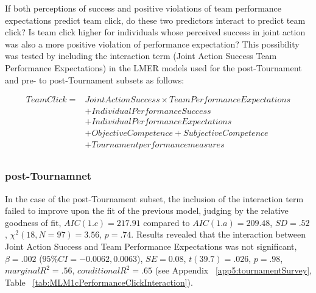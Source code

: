 \begin{landscape}
If both perceptions of success and positive violations of team performance expectations predict team click, do these two predictors interact to predict team click?  Is team click higher for individuals whose perceived success in joint action was also a more positive violation of performance expectation?  This possibility was tested by including the interaction term (Joint Action Success \times Team Performance Expectations) in the LMER models used for the post-Tournament and pre- to post-Tournament subsets as follows:

  \begin{equation}
    \begin{align*}
      Team Click =  & Joint Action Success \times Team Performance Expectations \\
                &+ Individual Performance Success \\
                &+ Individual Performance Expectations \\
                &+ Objective Competence + Subjective Competence  \\
                &+ Tournament performance measures \\
    \end{align*}
  \end{equation}
  \bigskip

  \subsubsection{post-Tournamnet}
  In the case of the post-Tournament subset, the inclusion of the interaction term failed to improve upon the fit of the previous model, judging by the relative goodness of fit, $AIC(1.c) = 217.91$ compared to $AIC(1.a) = 209.48$, $SD = .52 $, $\chi^2(18, N = 97) = 3.56$, $ p =.74$.
  Results revealed that the interaction between Joint Action Success and Team Performance Expectations was not significant, $\beta = .002$ ($95\% CI =  -0.0062, 0.0063$), $SE = 0.08$, $t(39.7) = .026$, $p = .98$, $marginal R^2 = .56$, $conditional R^2 = .65$ (see Appendix ~\ref{app5:tournamentSurvey}, Table ~\ref{tab:MLM1cPerformanceClickInteraction}).





\end{landscape}
